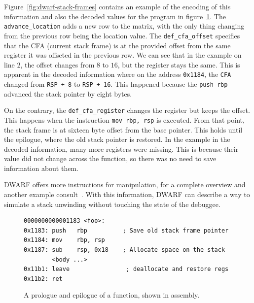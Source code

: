 Figure~\ref{fig:dwarf-stack-frames} contains an example of the encoding of this
information and also the decoded values for the program in
figure~\ref{fig:prologue-and-epilogue}. The \texttt{advance\_location} adds a
new row to the matrix, with the only thing changing from the previous row being
the location value. The \texttt{def\_cfa\_offset} specifies that the CFA
(current stack frame) is at the provided offset from the same register it was
offseted in the previous row. We can see that in the example on line $2$, the
offset changes from $8$ to $16$, but the register stays the same. This is
apparent in the decoded information where on the address \texttt{0x1184}, the
\texttt{CFA} changed from \texttt{RSP + 8} to \texttt{RSP + 16}. This happened
because the \texttt{push rbp} advanced the stack pointer by eight bytes.

On the contrary, the \verb|def_cfa_register| changes the register but keeps the
offset. This happens when the instruction \texttt{mov rbp, rsp} is executed.
From that point, the stack frame is at sixteen byte offset from the base
pointer. This holds until the epilogue, where the old stack pointer is
restored. In the example in the decoded information, many more registers were
missing. This is because their value did not change across the function, so
there was no need to save information about them.

DWARF offers more instructions for manipulation, for a complete overview and
another example consult~\cite{dwarf}. With this information, DWARF can describe
a way to simulate a stack unwinding without touching the state of the debuggee.

\begin{figure}
    \begin{lstlisting}
0000000000001183 <foo>:
0x1183:	push   rbp          ; Save old stack frame pointer
0x1184:	mov    rbp, rsp     
0x1187:	sub    rsp, 0x18    ; Allocate space on the stack
        <body ...>
0x11b1:	leave                ; deallocate and restore regs
0x11b2:	ret
    \end{lstlisting}
    \caption{A prologue and epilogue of a function, shown in assembly.}
    \label{fig:prologue-and-epilogue}
\end{figure}

